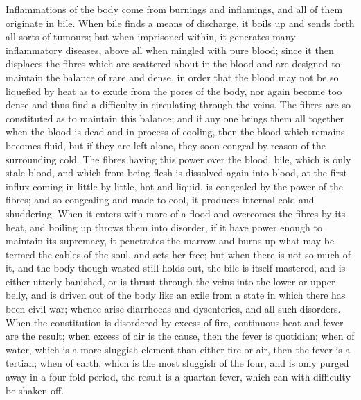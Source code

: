 Inflammations of the body come from burnings and inflamings, and all of
them originate in bile. When bile finds a means of discharge, it boils up
and sends forth all sorts of tumours; but when imprisoned within, it
generates many inflammatory diseases, above all when mingled with pure
blood; since it then displaces the fibres which are scattered about in the
blood and are designed to maintain the balance of rare and dense, in order
that the blood may not be so liquefied by heat as to exude from the pores
of the body, nor again become too dense and thus find a difficulty in
circulating through the veins. The fibres are so constituted as to
maintain this balance; and if any one brings them all together when the
blood is dead and in process of cooling, then the blood which remains
becomes fluid, but if they are left alone, they soon congeal by reason of
the surrounding cold. The fibres having this power over the blood, bile,
which is only stale blood, and which from being flesh is dissolved again
into blood, at the first influx coming in little by little, hot and
liquid, is congealed by the power of the fibres; and so congealing and
made to cool, it produces internal cold and shuddering. When it enters
with more of a flood and overcomes the fibres by its heat, and boiling up
throws them into disorder, if it have power enough to maintain its
supremacy, it penetrates the marrow and burns up what may be termed the
cables of the soul, and sets her free; but when there is not so much of
it, and the body though wasted still holds out, the bile is itself
mastered, and is either utterly banished, or is thrust through the veins
into the lower or upper belly, and is driven out of the body like an exile
from a state in which there has been civil war; whence arise diarrhoeas
and dysenteries, and all such disorders. When the constitution is
disordered by excess of fire, continuous heat and fever are the result;
when excess of air is the cause, then the fever is quotidian; when of
water, which is a more sluggish element than either fire or air, then the
fever is a tertian; when of earth, which is the most sluggish of the four,
and is only purged away in a four-fold period, the result is a quartan
fever, which can with difficulty be shaken off.

